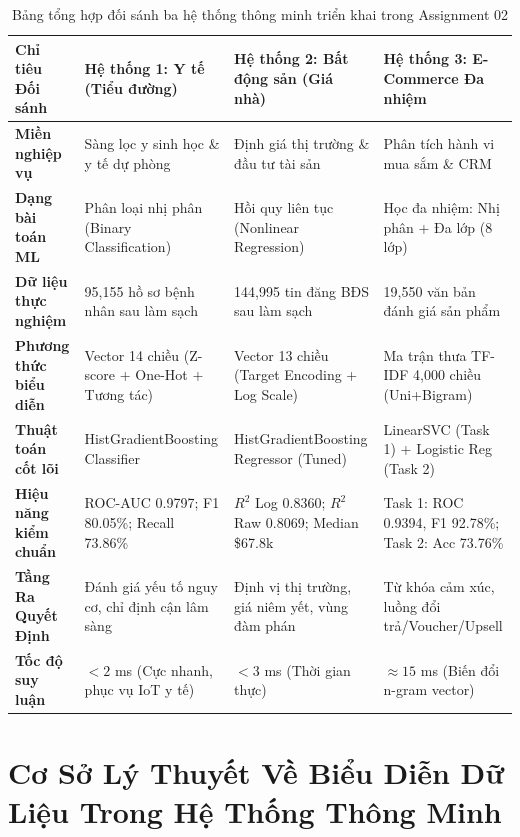 \documentclass[12pt,a4paper]{report}
\begin{document}
\begin{table}[H]
\centering
\scriptsize
\caption{Bảng tổng hợp đối sánh ba hệ thống thông minh triển khai trong Assignment 02}
\label{tab:executive_summary_table}
\begin{tabularx}{\textwidth}{lXXX}
\toprule
\textbf{Chỉ tiêu Đối sánh} & \textbf{Hệ thống 1: Y tế (Tiểu đường)} & \textbf{Hệ thống 2: Bất động sản (Giá nhà)} & \textbf{Hệ thống 3: E-Commerce Đa nhiệm} \\
\midrule
\textbf{Miền nghiệp vụ} & Sàng lọc y sinh học \& y tế dự phòng & Định giá thị trường \& đầu tư tài sản & Phân tích hành vi mua sắm \& CRM \\
\textbf{Dạng bài toán ML} & Phân loại nhị phân (Binary Classification) & Hồi quy liên tục (Nonlinear Regression) & Học đa nhiệm: Nhị phân + Đa lớp (8 lớp) \\
\textbf{Dữ liệu thực nghiệm} & 95,155 hồ sơ bệnh nhân sau làm sạch & 144,995 tin đăng BĐS sau làm sạch & 19,550 văn bản đánh giá sản phẩm \\
\textbf{Phương thức biểu diễn} & Vector 14 chiều (Z-score + One-Hot + Tương tác) & Vector 13 chiều (Target Encoding + Log Scale) & Ma trận thưa TF-IDF 4,000 chiều (Uni+Bigram) \\
\textbf{Thuật toán cốt lõi} & HistGradientBoosting Classifier & HistGradientBoosting Regressor (Tuned) & LinearSVC (Task 1) + Logistic Reg (Task 2) \\
\textbf{Hiệu năng kiểm chuẩn} & ROC-AUC 0.9797; F1 80.05\%; Recall 73.86\% & $R^2$ Log 0.8360; $R^2$ Raw 0.8069; Median \$67.8k & Task 1: ROC 0.9394, F1 92.78\%; Task 2: Acc 73.76\% \\
\textbf{Tầng Ra Quyết Định} & Đánh giá yếu tố nguy cơ, chỉ định cận lâm sàng & Định vị thị trường, giá niêm yết, vùng đàm phán & Từ khóa cảm xúc, luồng đổi trả/Voucher/Upsell \\
\textbf{Tốc độ suy luận} & $< 2$ ms (Cực nhanh, phục vụ IoT y tế) & $< 3$ ms (Thời gian thực) & $\approx 15$ ms (Biến đổi n-gram vector) \\
\bottomrule
\end{tabularx}
\end{table}

\newpage

\chapter{Cơ Sở Lý Thuyết Về Biểu Diễn Dữ Liệu Trong Hệ Thống Thông Minh}
\end{document}
